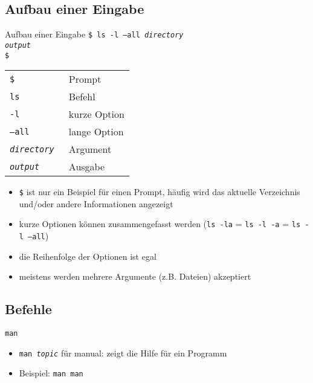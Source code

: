   \subsection{Aufbau einer Eingabe}
    \begin{frame}{Aufbau einer Eingabe}
      \texttt{\$ ls -l --all \textit{directory}\\
              \textit{output}\\
              \$}
      \begin{center}
        \begin{tabular}{>{\tt}l l}
          \toprule
          \$                 & Prompt       \\
          ls                 & Befehl       \\
          -l                 & kurze Option \\
          --all              & lange Option \\
          \textit{directory} & Argument     \\
          \textit{output}    & Ausgabe      \\
          \bottomrule
        \end{tabular}
      \end{center}
    \end{frame}

    \begin{frame}
      \begin{itemize}
        \item \texttt{\$} ist nur ein Beispiel für einen Prompt, häufig wird das aktuelle Verzeichnis und/oder andere Informationen angezeigt
        \item kurze Optionen können zusammengefasst werden (\texttt{ls~-la} = \texttt{ls -l -a} = \texttt{ls -l --all})
        \item die Reihenfolge der Optionen ist egal
        \item meistens werden mehrere Argumente (z.B. Dateien) akzeptiert
      \end{itemize}
    \end{frame}

  \subsection{Befehle}
    \begin{frame}{\texttt{man}}
      \begin{itemize}
        \item \texttt{man \textit{topic}} für manual: zeigt die Hilfe für ein Programm
        \item Beispiel: \texttt{man man}
      \end{itemize}
    \end{frame}

